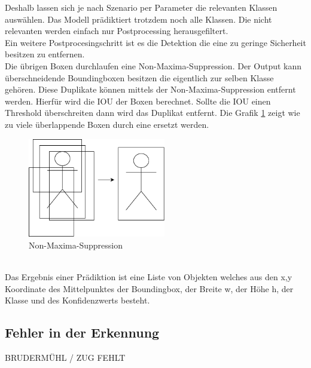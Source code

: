 \documentclass[conference]{IEEEtran}
\begin{document}
	Deshalb lassen sich je nach Szenario per Parameter die relevanten Klassen auswählen. Das Modell prädiktiert trotzdem noch alle Klassen. Die nicht relevanten werden einfach nur Postprocessing herausgefiltert.\\
	Ein weitere Postprocesingschritt ist es die Detektion die eine zu geringe Sicherheit besitzen zu entfernen.\\
	Die übrigen Boxen durchlaufen eine Non-Maxima-Suppression.
	Der Output kann überschneidende Boundingboxen besitzen die eigentlich zur selben Klasse gehören. Diese Duplikate können mittels der Non-Maxima-Suppression entfernt werden. Hierfür wird die IOU der Boxen berechnet. Sollte die IOU einen Threshold überschreiten dann wird das Duplikat entfernt. Die Grafik \ref{NMS} zeigt wie zu viele überlappende Boxen durch eine ersetzt werden.\\
	\begin{figure}[!h]
		\begin{center}
			\includegraphics[width=6cm]{Media/NMS.png}
			\caption{Non-Maxima-Suppression}
			\label{NMS}
		\end{center}
	\end{figure}\\
	Das Ergebnis einer Prädiktion ist eine Liste von Objekten welches aus den x,y Koordinate des Mittelpunktes der Boundingbox, der Breite w, der Höhe h, der Klasse und des Konfidenzwerts besteht.
	
	\subsection{Fehler in der Erkennung}
	BRUDERMÜHL / ZUG FEHLT
	
\end{document}
